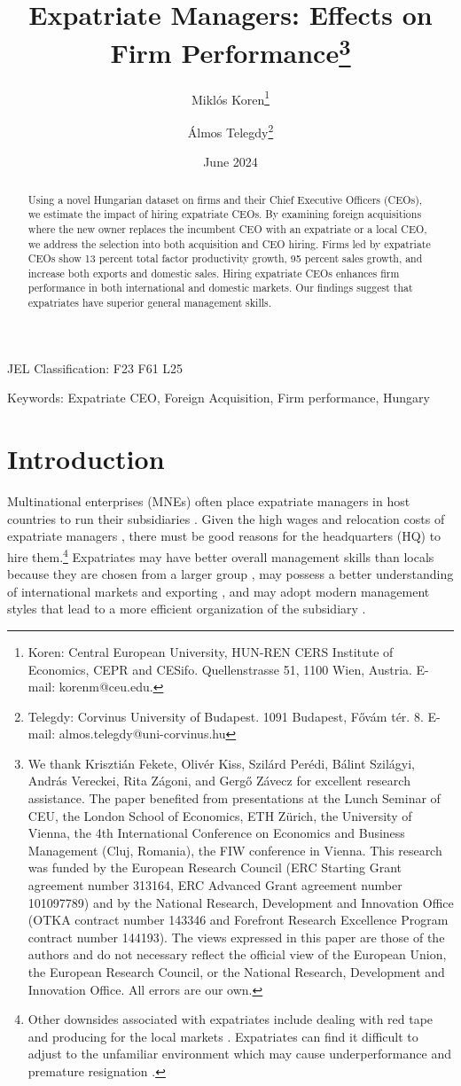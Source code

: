 \documentclass[12pt,a4paper]{article}
\title{Expatriate Managers: Effects on Firm Performance\thanks{We thank Krisztián Fekete, Olivér Kiss, Szilárd Perédi, Bálint Szilágyi, András Vereckei, Rita Zágoni, and Gergő Závecz for excellent research assistance. The paper benefited from presentations at the Lunch Seminar of CEU, the London School of Economics, ETH Zürich, the University of Vienna, the 4th International Conference on Economics and Business Management (Cluj, Romania), the FIW conference in Vienna. This research was funded by the European Research Council (ERC Starting Grant agreement number 313164, ERC Advanced Grant agreement number 101097789) and by the National Research, Development and Innovation Office (OTKA contract number 143346 and Forefront Research Excellence Program contract number 144193). The views expressed in this paper are those of the authors and do not necessary reflect the official view of the European Union, the European Research Council, or the National Research, Development and Innovation Office. All errors are our own.}}
\author{Miklós Koren\thanks{Koren: Central European University, HUN-REN CERS Institute of Economics, CEPR and CESifo. Quellenstrasse 51, 1100 Wien, Austria. E-mail: korenm@ceu.edu.} \and Álmos Telegdy\thanks{Telegdy: Corvinus University of Budapest. 1091 Budapest, Fővám tér. 8. E-mail: almos.telegdy@uni-corvinus.hu}}
\date{June 2024}
\begin{document}
\maketitle
\thispagestyle{empty}

\begin{abstract}
\noindent Using a novel Hungarian dataset on firms and their Chief Executive Officers (CEOs), we estimate the impact of hiring expatriate CEOs. By examining foreign acquisitions where the new owner replaces the incumbent CEO with an expatriate or a local CEO, we address the selection into both acquisition and CEO hiring. Firms led by expatriate CEOs show 13 percent total factor productivity growth, 95 percent sales growth, and increase both exports and domestic sales. Hiring expatriate CEOs enhances firm performance in both international and domestic markets. Our findings suggest that expatriates have superior general management skills.
\end{abstract}

JEL Classification: F23 F61 L25

Keywords: Expatriate CEO, Foreign Acquisition, Firm performance, Hungary

\clearpage
\setcounter{page}{1}

\section{Introduction}\label{sec: intro}

Multinational enterprises (MNEs) often place expatriate managers in host countries to run their subsidiaries \citep{meyer2020managing}. Given the high wages and relocation costs of expatriate managers \citep{harvey2009expatriate}, there must be good reasons for the headquarters (HQ) to hire them.\footnote{Other downsides associated with expatriates include dealing with red tape and producing for the local markets \citep{tan2006multinational}. Expatriates can find it difficult  to adjust to the unfamiliar environment \citep{haslberger2013dimensions} which may cause underperformance \citep{collings2007changing} and premature resignation \citep{mcginley2008expatriate}.} Expatriates may have better overall management skills than locals because they are chosen from a larger group \citep{selmer2001expatriate}, may possess a better understanding of international markets and exporting \citep{piaskowska2014twice}, and may adopt modern management styles that lead to a more efficient organization of the subsidiary \citep{chang2012expatriate, fang2010multinational, meinen2022managers}.
\end{document}
